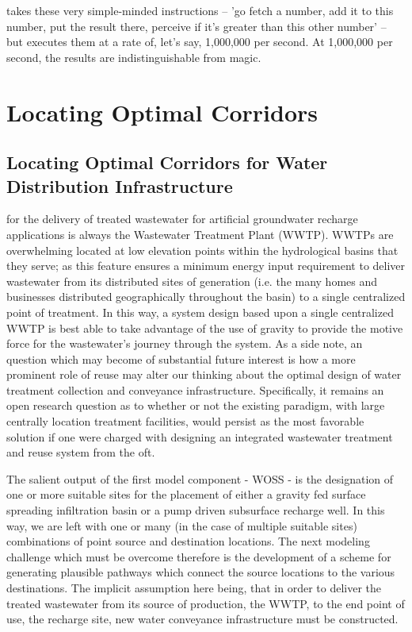\begin{savequote}[75mm]
[A computer] takes these very simple-minded instructions -- 'go fetch a number, add it to this number, put the result there, perceive if it's greater than this other number' -- but executes them at a rate of, let's say, 1,000,000 per second. At 1,000,000 per second, the results are indistinguishable from magic.
\end{savequote}

\chapter{Locating Optimal Corridors}
\label{Chapter 2}

\newpage

  \section{Locating Optimal Corridors for Water Distribution Infrastructure}
 
 for the delivery of treated wastewater for artificial groundwater recharge applications is always the Wastewater Treatment Plant (WWTP). WWTPs are overwhelming located at low elevation points within the hydrological basins that they serve; as this feature ensures a minimum energy input requirement to deliver wastewater from its distributed sites of generation (i.e. the many homes and businesses distributed geographically throughout the basin) to a single centralized point of treatment. In this way, a system design based upon a single centralized WWTP is best able to take advantage of the use of gravity to provide the motive force for the wastewater's journey through the system. As a side note, an question which may become of substantial future interest is how a more prominent role of reuse may alter our thinking about the optimal design of water treatment collection and conveyance infrastructure. Specifically, it remains an open research question as to whether or not the existing paradigm, with large centrally location treatment facilities, would persist as the most favorable solution if one were charged with designing an integrated wastewater treatment and reuse system from the oft.
                
The salient output of the first model component - WOSS - is the designation of one or more suitable sites for the placement of either a gravity fed surface spreading infiltration basin or a pump driven subsurface recharge well. In this way, we are left with one or many (in the case of multiple suitable sites) combinations of point source and destination locations. The next modeling challenge which must be overcome therefore is the development of a scheme for generating plausible pathways which connect the source locations to the various destinations. The implicit assumption here being, that in order to deliver the treated wastewater from its source of production, the WWTP, to the end point of use, the recharge site, new water conveyance infrastructure must be constructed.
        

